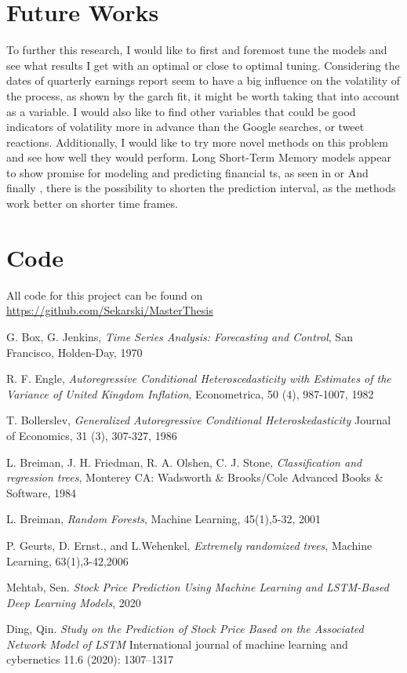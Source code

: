 \documentclass[10pt]{report}
\begin{document}
\chapter{Future Works}
To further this research, I would like to first and foremost tune the models and see what results I get with an optimal or close to optimal tuning.
Considering the dates of quarterly earnings report seem to have a big influence on the volatility of the process, as shown by the \acrlong{garch} fit, it might be worth taking that into account as a variable. I would also like to find other variables that could be good indicators of volatility more in advance than the Google searches, or tweet reactions.
Additionally, I would like to try more novel methods on this problem and see how well they would perform. Long Short-Term Memory models appear to show promise for modeling and predicting financial \acrlong{ts}, as seen in \cite{LSTMpaper1} or \cite{LSTMpaper2}
And finally , there is the possibility to shorten the prediction interval, as the methods work better on shorter time frames.

\chapter*{Code}
All code for this project can be found on \url{https://github.com/Sekarski/MasterThesis}

\begin{thebibliography}{9}

G. Box, G. Jenkins, \textit{Time Series Analysis: Forecasting and Control}, San Francisco, Holden-Day, 1970

R. F. Engle, \textit{Autoregressive Conditional Heteroscedasticity with Estimates of the Variance of United Kingdom Inflation}, Econometrica, 50 (4), 987-1007, 1982

T. Bollerslev, \textit{Generalized Autoregressive Conditional Heteroskedasticity} Journal of Economics, 31 (3), 307-327, 1986

L. Breiman, J. H. Friedman, R. A. Olshen, C. J. Stone, \textit{Classification and regression trees}, Monterey CA: Wadsworth \& Brooks/Cole Advanced Books \& Software, 1984

L. Breiman, \textit{Random Forests}, Machine Learning, 45(1),5-32, 2001

P. Geurts, D. Ernst., and L.Wehenkel, \textit{Extremely randomized trees}, Machine Learning, 63(1),3-42,2006

Mehtab, Sen. \textit{Stock Price Prediction Using Machine Learning and LSTM-Based Deep Learning Models}, 2020

Ding, Qin. \textit{Study on the Prediction of Stock Price Based on the Associated Network Model of LSTM} International journal of machine learning and cybernetics 11.6 (2020): 1307–1317

\end{thebibliography}


\printglossary[type=\acronymtype]
\printglossary
\end{document}
